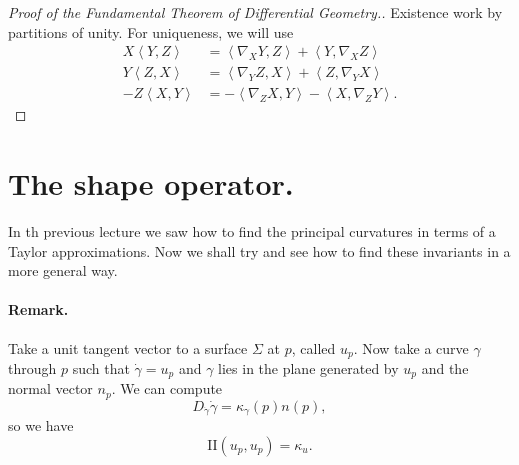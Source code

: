 \begin{proof}[Proof of the Fundamental Theorem of Differential Geometry.]
    Existence work by partitions of unity. For uniqueness, we will use
    \begin{align*}
        X \left\langle Y, Z \right\rangle &= \left\langle \nabla_X Y, Z \right\rangle + \left\langle Y, \nabla_X Z \right\rangle \\
        Y \left\langle Z, X \right\rangle &= \left\langle \nabla_Y Z, X \right\rangle + \left\langle Z, \nabla_Y X \right\rangle \\
        -Z \left\langle X, Y \right\rangle &= - \left\langle \nabla_Z X, Y \right\rangle - \left\langle X, \nabla_Z Y \right\rangle.
    \end{align*}

\end{proof}

\section{The shape operator.}

In th previous lecture we saw how to find the principal curvatures in terms of a Taylor approximations. Now we shall try and see how to find these invariants in a more general way.

\paragraph{Remark.} Take a unit tangent vector to a surface \( \Sigma \) at \( p \), called \( u_p \). Now take a curve \( \gamma \) through \( p \) such that \( \dot{ \gamma } = u_p  \) and \( \gamma \) lies in the plane generated by \( u_p \) and the normal vector \( n_p \). We can compute
\[ 
    D_{ \dot{ \gamma } } \dot{\gamma} = \kappa_\gamma(p)n(p),
\]
so we have
\[ 
    \mathrm{I\!I}(u_p,u_p) = \kappa_u.
\]


